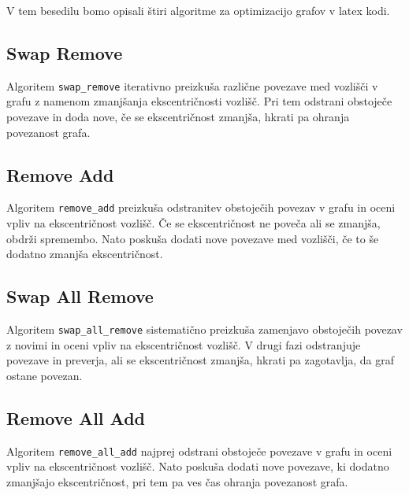 \documentclass[fin1, tisk]{fmfdelo}
\begin{document}
V tem besedilu bomo opisali štiri algoritme za optimizacijo grafov v latex kodi.

\subsection*{Swap Remove}
Algoritem \texttt{swap\_remove} iterativno preizkuša različne povezave med vozlišči v grafu z namenom zmanjšanja ekscentričnosti vozlišč. Pri tem odstrani obstoječe povezave in doda nove, če se ekscentričnost zmanjša, hkrati pa ohranja povezanost grafa.

\subsection*{Remove Add}
Algoritem \texttt{remove\_add} preizkuša odstranitev obstoječih povezav v grafu in oceni vpliv na ekscentričnost vozlišč. Če se ekscentričnost ne poveča ali se zmanjša, obdrži spremembo. Nato poskuša dodati nove povezave med vozlišči, če to še dodatno zmanjša ekscentričnost.

\subsection*{Swap All Remove}
Algoritem \texttt{swap\_all\_remove} sistematično preizkuša zamenjavo obstoječih povezav z novimi in oceni vpliv na ekscentričnost vozlišč. V drugi fazi odstranjuje povezave in preverja, ali se ekscentričnost zmanjša, hkrati pa zagotavlja, da graf ostane povezan.

\subsection*{Remove All Add}
Algoritem \texttt{remove\_all\_add} najprej odstrani obstoječe povezave v grafu in oceni vpliv na ekscentričnost vozlišč. Nato poskuša dodati nove povezave, ki dodatno zmanjšajo ekscentričnost, pri tem pa ves čas ohranja povezanost grafa.
\end{document}

